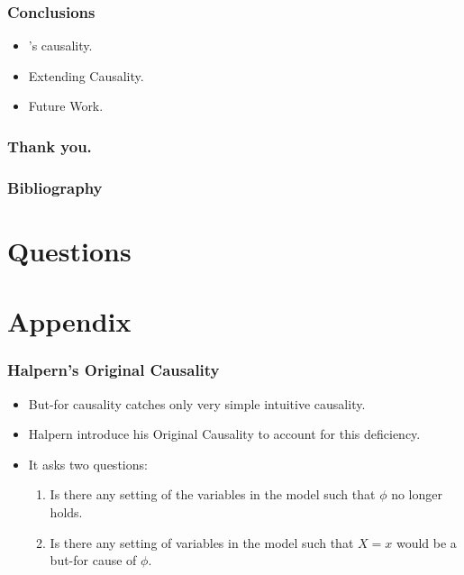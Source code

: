 \documentclass{beamer}
\theoremstyle{plain}
\theoremstyle{definition}
\begin{document}
\begin{frame}
\frametitle{Conclusions}
\begin{itemize}
\item \citet{halpern2005causes}'s causality.
\item Extending Causality.
\item Future Work.
\end{itemize}

\end{frame}

\begin{frame}
\frametitle{Thank you.}

\end{frame}

\begin{frame}
\frametitle{Bibliography}
 

\end{frame}


\section{Questions}

\section{Appendix}
























\begin{frame}
\frametitle{Halpern's Original Causality}
\begin{itemize}
\item But-for causality catches only very simple intuitive causality.
\item Halpern introduce his Original Causality to account for this deficiency.
\item It asks two questions:
\begin{enumerate}
\item Is there any setting of the variables in the model such that $\phi$ no longer holds.
\item Is there any setting of variables in the model such that $X=x$ would be a but-for cause of $\phi$.
\end{enumerate}
\end{itemize}

\end{frame}
\end{document}
